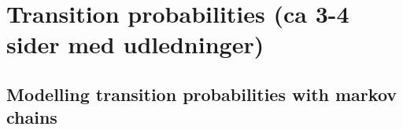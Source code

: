 
\chapter{Transition probabilities (ca 3-4 sider med udledninger)}
\label{chap:transprob}
\section{Modelling transition probabilities with markov chains}

